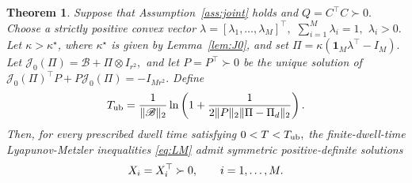 \documentclass[conference]{IEEEtran}
\newtheorem{theorem}{Theorem}
\begin{document}
	\begin{theorem}\label{thm:feasibility}
		Suppose that Assumption~\ref{ass:joint} holds and
		$
		Q=C^\top C\succ0.
		$
		Choose a strictly positive convex vector
		$
		\lambda
		=
		[\lambda_1,\ldots,\lambda_M]^\top,
		$
		$
		\sum_{i=1}^{M}\lambda_i=1,
		$
		$
		\lambda_i>0.
		$
		Let $\kappa>\kappa^\star$, where $\kappa^\star$ is given by
		Lemma~\ref{lem:J0}, and set
		$
		\Pi
		=
		\kappa
		\left(
		\mathbf 1_M\lambda^\top-I_M
		\right).
		$
		Let
		$
		\mathcal J_0(\Pi)
		=
		\mathscr B
		+
		\Pi\otimes I_{r^2},
		$
		and let $P=P^\top\succ0$ be the unique solution of
		$
		\mathcal J_0(\Pi)^\top P
		+
		P\mathcal J_0(\Pi)
		=
		-I_{Mr^2}.
		\label{eq:J0_Lyapunov}
		$
		Define
		\vspace{-0.2\baselineskip}
		\begin{equation}
			T_{\rm ub}
			=
			\frac{1}{\|\mathscr B\|_2}
			\ln
			\left(
			1
			+
			\frac{1}{
				2\|P\|_2
				\|\Pi-\Pi_d\|_2
			}
			\right).
			\label{eq:Tub}	
			\vspace{-0.2\baselineskip}		
		\end{equation}
		Then, for every prescribed dwell time satisfying
		$
		0<T<T_{\rm ub},
		$
		the finite-dwell-time Lyapunov-Metzler inequalities
		\eqref{eq:LM} admit symmetric positive-definite solutions
		\vspace{-0.2\baselineskip}
		\[
		X_i=X_i^\top\succ0,
		\qquad
		i=1,\ldots,M.		
		\vspace{-0.2\baselineskip}
		\]
	\end{theorem}
	
\end{document}
